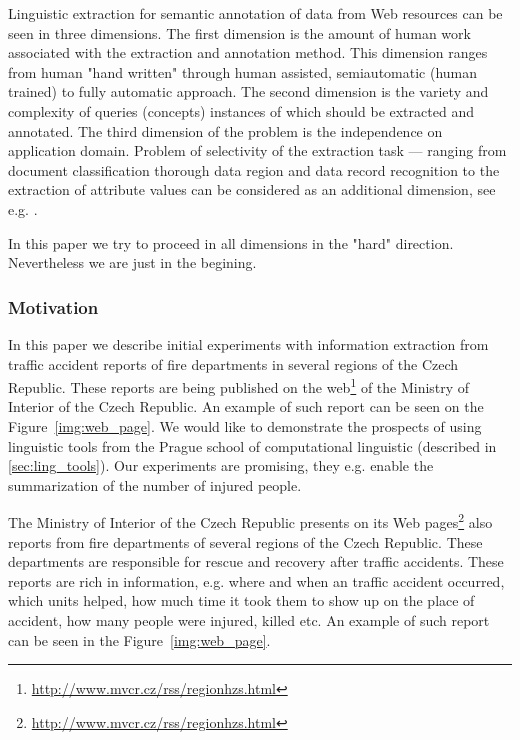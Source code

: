 Linguistic extraction for semantic annotation of data from Web resources can be seen in three dimensions. The first dimension is the amount of human work associated with the extraction and annotation method. This dimension ranges from human "hand written"  through human assisted, semiautomatic (human trained) to fully automatic approach. The second dimension is the variety and complexity of queries (concepts) instances of which should be extracted and annotated. The third dimension of the problem is the independence on application domain. Problem of selectivity of the extraction task --- ranging from document classification thorough data region and data record recognition to the extraction of attribute values can be considered as an additional dimension, see e.g.  \citep{biblio:Survey_of_Web_Information_Extraction_Systems}. 

In this paper we try to proceed in all dimensions in the "hard" direction. Nevertheless we are just in the begining.

\subsubsection{Motivation}



In this paper we describe initial experiments with information extraction from traffic accident reports of fire departments in several regions of the Czech Republic. These reports are being published on the web\footnote{\url{http://www.mvcr.cz/rss/regionhzs.html}} of the Ministry of Interior of the Czech Republic. An example of such report can be seen on the Figure~\ref{img:web_page}. We would like to demonstrate the prospects of using linguistic tools from the Prague school of computational linguistic (described in \ref{sec:ling_tools}). Our experiments are promising, they e.g. enable the summarization of the number of injured people. 

The Ministry of Interior of the Czech Republic presents on its Web pages\footnote{\url{http://www.mvcr.cz/rss/regionhzs.html}} also reports from fire departments of several regions of the Czech Republic. These departments are responsible for rescue and recovery after traffic accidents. These reports are rich in information, e.g. where and when an traffic accident occurred, which units helped, how much time it took them to show up on the place of accident, how many people were injured, killed etc. An example of such report can be seen in the Figure~\ref{img:web_page}.






